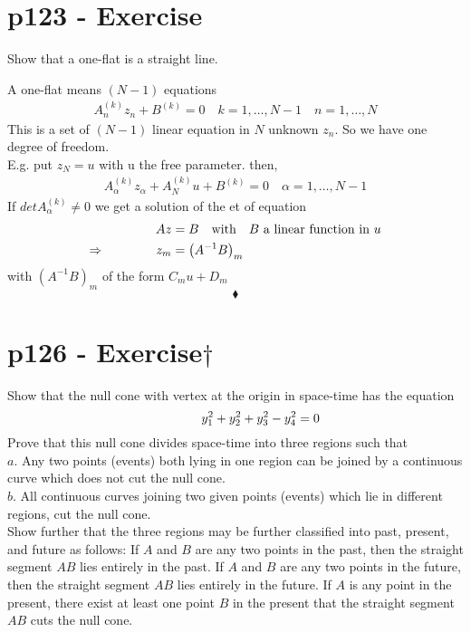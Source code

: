 \section{p123 - Exercise}
\begin{tcolorbox}
Show that a one-flat is a straight line.
\end{tcolorbox}
A one-flat means $(N-1)$ equations 
\begin{align}
A^{(k)}_nz_n + B^{(k)} =0 \quad k=1,\dots,N-1\quad n= 1,\dots,N
\end{align}
This is a set of $(N-1)$ linear equation in $N$ unknown $z_n$. So we have one degree of freedom.\\
E.g. put $z_N=u$ with u the free parameter. then,
\begin{align}
A^{(k)}_{\alpha}z_{\alpha}+ A^{(k)}_{N}u+ B^{(k)} =0 \quad \alpha=1,\dots,N-1
\end{align}
If $detA^{(k)}_{\alpha} \neq0$ we get a solution of the et of equation
\begin{align}
Az&=B \quad\text{with}\quad B \text{ a linear function in } u\\
\Rightarrow\quad\quad\quad\quad z_m&= \left(A^{-1}B\right)_m
\end{align}
with $\left(A^{-1}B\right)_m$ of the form $C_mu+D_m$
$$\blacklozenge$$
\newpage

\section{p126 - Exercise$\dagger$}
\begin{tcolorbox}
Show that the null cone with vertex at the origin in space-time has the equation $$\mathbf{\quad\quad\quad\quad} y^2_1+y^2_2+y^2_3-y^2_4=0$$
Prove that this null cone divides space-time into three regions such that \\
$\mathit{a.}$ Any two points (events) both lying in one region can be joined by a continuous curve which does not cut the null cone.\\
$\mathit{b.}$ All continuous curves joining two given points (events) which lie in different regions, cut the null cone.\\
Show further that the three regions may be further classified into past, present, and future as follows: If $A$ and $B$ are any two points in the past, then the straight segment $AB$ lies entirely in the past. If $A$ and $B$ are any two points in the future, then the straight segment $AB$ lies entirely in the future. If $A$ is any point in the present, there exist at least one point $B$ in the present that the straight segment $AB$ cuts the null cone.
\end{tcolorbox}

